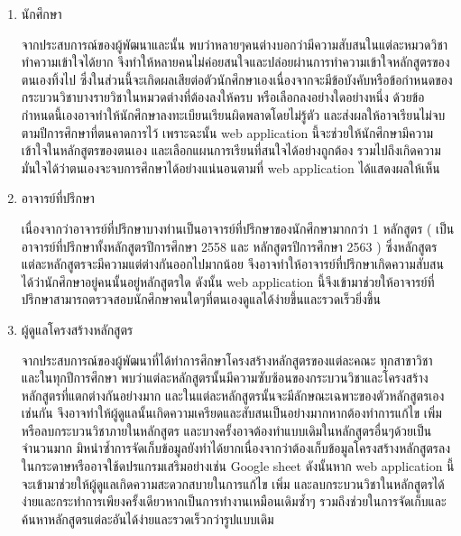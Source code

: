 \begin{enumerate}
    \item นักศึกษา 
	
    จากประสบการณ์ของผู้พัฒนาและนั้น พบว่าหลายๆคนต่างบอกว่ามีความสับสนในแต่ละหมวดวิชา ทำความเข้าใจได้ยาก จึงทำให้หลายคนไม่ค่อยสนใจและปล่อยผ่านการทำความเข้าใจหลักสูตรของตนเองทิ้งไป  ซึ่งในส่วนนี้จะเกิดผลเสียต่อตัวนักศึกษาเองเนื่องจากจะมีข้อบังคับหรือข้อกำหนดของกระบวนวิชาบางรายวิชาในหมวดต่างที่ต้องลงให้ครบ หรือเลือกลงอย่างใดอย่างหนึ่ง ด้วยข้อกำหนดนี้เองอาจทำให้นักศึกษาลงทะเบียนเรียนผิดพลาดโดยไม่รู้ตัว และส่งผลให้อาจเรียนไม่จบตามปีการศึกษาที่ตนคาดการไว้ เพราะฉะนั้น web application นี้จะช่วยให้นักศึกษามีความเข้าใจในหลักสูตรของตนเอง และเลือกแผนการเรียนที่สนใจได้อย่างถูกต้อง รวมไปถึงเกิดความมั่นใจได้ว่าตนเองจะจบการศึกษาได้อย่างแน่นอนตามที่ web application ได้แสดงผลให้เห็น  

    
    \item อาจารย์ที่ปรึกษา 
	
    เนื่องจากว่าอาจารย์ที่ปรึกษาบางท่านเป็นอาจารย์ที่ปรึกษาของนักศึกษามากกว่า 1 หลักสูตร ( เป็นอาจารย์ที่ปรึกษาทั้งหลักสูตรปีการศึกษา 2558 และ หลักสูตรปีการศึกษา 2563 ) ซึ่งหลักสูตรแต่ละหลักสูตรจะมีความแต่ต่างกันออกไปมากน้อย จึงอาจทำให้อาจารย์ที่ปรึกษาเกิดความสับสนได้ว่านักศึกษาอยู่คนนั้นอยู่หลักสูตรใด ดังนั้น web application นี้จึงเข้ามาช่วยให้อาจารย์ที่ปรึกษาสามารถตรวจสอบนักศึกษาคนใดๆที่ตนเองดูแลได้ง่ายขึ้นและรวดเร็วยิ่งขึ้น

   
    \item ผู้ดูแลโครงสร้างหลักสูตร 
	
    จากประสบการณ์ของผู้พัฒนาที่ได้ทำการศึกษาโครงสร้างหลักสูตรของแต่ละคณะ ทุกสาขาวิชา และในทุกปีการศึกษา พบว่าแต่ละหลักสูตรนั้นมีความซับซ้อนของกระบวนวิชาและโครงสร้างหลักสูตรที่แตกต่างกันอย่างมาก และในแต่ละหลักสูตรนั้นจะมีลักษณะเฉพาะของตัวหลักสูตรเองเช่นกัน จึงอาจทำให้ผู้ดูแลนั้นเกิดความเครียดและสับสนเป็นอย่างมากหากต้องทำการแก้ไข เพิ่ม หรือลบกระบวนวิชาภายในหลักสูตร และบางครั้งอาจต้องทำแบบเดิมในหลักสูตรอื่นๆด้วยเป็นจำนวนมาก มิหนำซ้ำการจัดเก็บข้อมูลยังทำได้ยากเนื่องจากว่าต้องเก็บข้อมูลโครงสร้างหลักสูตรลงในกระดาษหรืออาจใช้ดปรแกรมเสริมอย่างเช่น Google sheet ดังนั้นหาก web application นี้จะเข้ามาช่วยให้ผู้ดูแลเกิดความสะดวกสบายในการแก้ไข เพิ่ม และลบกระบวนวิชาในหลักสูตรได้ง่ายและกระทำการเพียงครั้งเดียวหากเป็นการทำงานเหมือนเดิมซ้ำๆ รวมถึงช่วยในการจัดเก็บและค้นหาหลักสูตรแต่ละอันได้ง่ายและรวดเร็วกว่ารูปแบบเดิม   
\end{enumerate}
